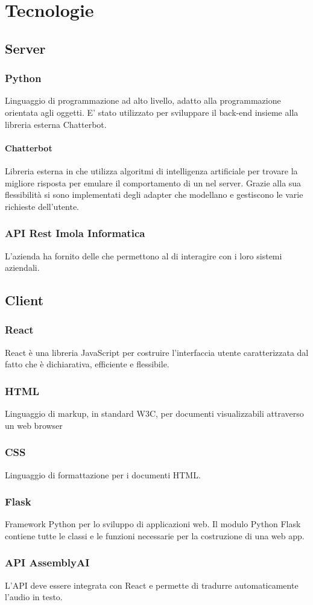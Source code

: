 \section{Tecnologie}
\subsection{Server}
\subsubsection{Python}
Linguaggio di programmazione ad alto livello, adatto alla programmazione orientata agli oggetti. E' stato utilizzato per sviluppare il back-end insieme alla libreria esterna Chatterbot.
\paragraph{Chatterbot}
Libreria esterna in  che utilizza algoritmi di intelligenza artificiale per trovare la migliore risposta per emulare il comportamento di un  nel server. \newline
Grazie alla sua flessibilità si sono implementati degli adapter che modellano e gestiscono le varie richieste dell'utente.
\subsubsection{API Rest Imola Informatica}
L'azienda ha fornito delle  che permettono al  di interagire con i loro sistemi aziendali.

\subsection{Client}
\subsubsection{React}
React è una libreria JavaScript per costruire l'interfaccia utente caratterizzata dal fatto che è dichiarativa, efficiente e flessibile.
\subsubsection{HTML}
Linguaggio di markup, in standard W3C, per documenti visualizzabili attraverso un web browser
\subsubsection{CSS}
Linguaggio di formattazione per i documenti HTML.
\subsubsection{Flask}
Framework Python per lo sviluppo di applicazioni web. Il modulo Python Flask contiene tutte le classi e le funzioni necessarie per la costruzione di una web app.
\subsubsection{API AssemblyAI}
L'API deve essere integrata con React e permette di tradurre automaticamente l'audio in testo.

\newpage